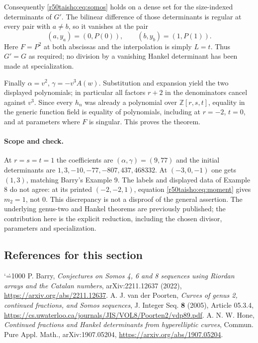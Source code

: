 \documentclass[11pt,a4paper]{article}
\makeatletter
\numberwithin{equation}{section}
\theoremstyle{definition}
\theoremstyle{remark}
\renewenvironment{thebibliography}[1]
 {\subsection*{References for this section}\small
  \list{\@biblabel{\@arabic\c@enumiv}}
       {\settowidth\labelwidth{\@biblabel{#1}}\leftmargin\labelwidth
        \advance\leftmargin\labelsep\@openbib@code
        \usecounter{enumiv}\let\p@enumiv\@empty
        \renewcommand\theenumiv{\@arabic\c@enumiv}}
  \sloppy\clubpenalty4000\widowpenalty4000\sfcode`\.=1000\relax}
 {\def\@noitemerr{\@latex@warning{Empty bibliography}}\endlist}
\makeatother
\begin{document}
Consequently \eqref{r50taisho:eq:somos} holds on a dense set for the size-indexed
determinants of $G'$. The bilinear difference of those determinants is
regular at every pair with $a\ne b$, so it vanishes at the pair
\[
 (a,y_a)=(0,P(0)),\qquad (b,y_b)=(1,P(1)).
\]
Here $F=P^2$ at both abscissas and the interpolation is simply $L=t$.
Thus $G'=G$ as required; no division by a vanishing Hankel determinant
has been made at specialization.

Finally $\alpha=v^2$, $\gamma=-v^3A(w)$. Substitution and expansion yield
the two displayed polynomials; in particular all factors $r+2$ in the
denominators cancel against $v^3$. Since every $h_n$ was already a
polynomial over $\mathbb Z[r,s,t]$, equality in the generic function field
is equality of polynomials, including at $r=-2$, $t=0$, and at parameters
where $F$ is singular. This proves the theorem.

\paragraph{Scope and check.}
At $r=s=t=1$ the coefficients are $(\alpha,\gamma)=(9,77)$ and the
initial determinants are $1,3,-10,-77,-807,437,468332$.
At $(-3,0,-1)$ one gets $(1,3)$, matching Barry's Example 9.
The labels and displayed data of Example 8 do not agree: at its printed
$(-2,-2,1)$, equation \eqref{r50taisho:eq:moment} gives $m_2=1$, not $0$.
This discrepancy is not a disproof of the general assertion. The
underlying genus-two and Hankel theorems are previously published; the
contribution here is the explicit reduction, including the chosen
divisor, parameters and specialization.

\begin{thebibliography}{9}
 P. Barry, \emph{Conjectures on Somos 4, 6 and 8 sequences using
Riordan arrays and the Catalan numbers}, arXiv:2211.12637 (2022),
\url{https://arxiv.org/abs/2211.12637}.
 A. J. van der Poorten, \emph{Curves of genus 2, continued
fractions, and Somos sequences}, J. Integer Seq. \textbf{8} (2005),
Article 05.3.4, \url{https://cs.uwaterloo.ca/journals/JIS/VOL8/Poorten2/vdp89.pdf}.
 A. N. W. Hone, \emph{Continued fractions and Hankel determinants
from hyperelliptic curves}, Commun. Pure Appl. Math., arXiv:1907.05204,
\url{https://arxiv.org/abs/1907.05204}.
\end{thebibliography}

\par\endgroup
\end{document}
